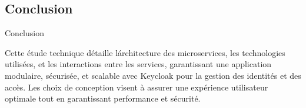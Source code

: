 \subsection{Conclusion}
\begin{frame}{Conclusion}

    Cette étude technique détaille l\'architecture des microservices, les technologies utilisées, et les interactions entre les services, garantissant une application modulaire, sécurisée, et scalable avec Keycloak pour la gestion des identités et des accès. Les choix de conception visent à assurer une expérience utilisateur optimale tout en garantissant performance et sécurité.
\end{frame}
